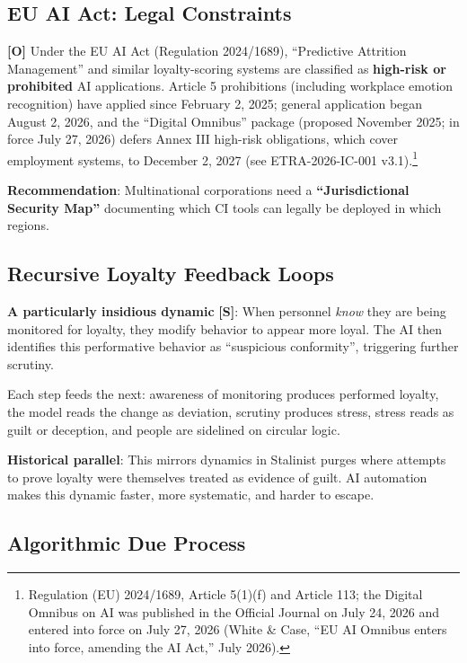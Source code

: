 \documentclass[11pt,letterpaper]{article}
\newcommand{\etraneed}[1]{\par\ifdim\pagegoal<\maxdimen\ifdim\pagetotal<\pagegoal\ifdim\dimexpr\pagegoal-\pagetotal\relax<\dimexpr#1\relax\newpage\fi\fi\fi}
\begin{document}
\subsection{EU AI Act: Legal Constraints}

\textbf{[O]} Under the EU AI Act (Regulation 2024/1689), ``Predictive Attrition Management'' and similar loyalty-scoring systems are classified as \textbf{high-risk or prohibited} AI applications. Article 5 prohibitions (including workplace emotion recognition) have applied since February 2, 2025; general application began August 2, 2026, and the ``Digital Omnibus'' package (proposed November 2025; in force July 27, 2026) defers Annex III high-risk obligations, which cover employment systems, to December 2, 2027 (see ETRA-2026-IC-001 v3.1).\footnote{Regulation (EU) 2024/1689, Article 5(1)(f) and Article 113; the Digital Omnibus on AI was published in the Official Journal on July 24, 2026 and entered into force on July 27, 2026 (White \& Case, ``EU AI Omnibus enters into force, amending the AI Act,'' July 2026).}

\textbf{Recommendation}: Multinational corporations need a \textbf{``Jurisdictional Security Map''} documenting which CI tools can legally be deployed in which regions.

\subsection{Recursive Loyalty Feedback Loops}

\textbf{A particularly insidious dynamic} \textbf{[S]}: When personnel \textit{know} they are being monitored for loyalty, they modify behavior to appear more loyal. The AI then identifies this performative behavior as ``suspicious conformity'', triggering further scrutiny.

Each step feeds the next: awareness of monitoring produces performed loyalty, the model reads the change as deviation, scrutiny produces stress, stress reads as guilt or deception, and people are sidelined on circular logic.

\textbf{Historical parallel}: This mirrors dynamics in Stalinist purges where attempts to prove loyalty were themselves treated as evidence of guilt. AI automation makes this dynamic faster, more systematic, and harder to escape.

\etraneed{14\baselineskip}
\subsection{Algorithmic Due Process}
\end{document}

